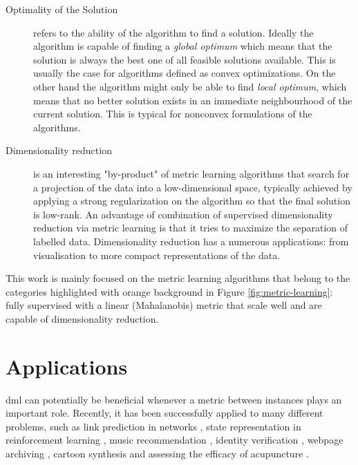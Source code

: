 \documentclass[12pt,a4paper]{report}
\begin{document}
\begin{description}
\item [Optimality of the Solution] refers to the ability of the algorithm to find a solution. Ideally the algorithm is capable of finding a \textit{global optimum} which means that the solution is always the best one of all feasible solutions available. This is usually the case for algorithms defined as convex optimizations. On the other hand the algorithm might only be able to find \textit{local optimum}, which means that no better solution exists in an immediate neighbourhood of the current solution. This is typical for nonconvex formulations of the algorithms.

\item [Dimensionality reduction] is an interesting "by-product" of metric learning algorithms that search for a projection of the data into a low-dimensional space, typically achieved by applying a strong regularization on the algorithm so that the final solution is low-rank. An advantage of combination of supervised dimensionality reduction via metric learning is that it tries to maximize the separation of labelled data. Dimensionality reduction has a numerous applications: from visualisation to more compact representations of the data.
\end{description}

This work is mainly focused on the metric learning algorithms that belong to the categories highlighted with orange background in Figure \ref{fig:metric-learning}: fully supervised with a linear (Mahalanobis) metric that scale well and are capable of dimensionality reduction. 

\section{Applications} \label{chap:intro:applications}

\acl{dml} can potentially be beneficial whenever a metric
between instances plays an important role. Recently, it has been successfully applied to many different problems, such as link prediction in networks \citep{shaw2011learning}, state representation in reinforcement learning \citep{taylor2011metric}, music recommendation \citep{mcfee2012learning}, identity verification \citep{ben2012improved}, webpage archiving \citep{law2012structural}, cartoon synthesis \citep{yu2012semisupervised} and assessing the efficacy of acupuncture \citep{liang2012learning}.
\end{document}
